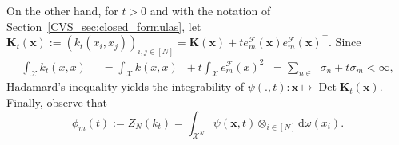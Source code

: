 \documentclass[twoside,11pt]{book}
\numberwithin{theorem}{chapter}
\numberwithin{definition}{chapter}
\numberwithin{proposition}{chapter}
\numberwithin{corollary}{chapter}
\numberwithin{example}{chapter}
\numberwithin{lemma}{chapter}
\numberwithin{assumption}{chapter}
\numberwithin{equation}{chapter}
\numberwithin{figure}{chapter}
\DeclareMathOperator{\Det}{Det}
\DeclareMathOperator{\Tran}{\intercal}
\DeclareMathOperator{\F}{\mathcal{F}}
\DeclareMathOperator{\X}{\mathcal{X}}
\DeclareMathOperator{\Mu}{\mathrm{d}\omega(x)}
\DeclareMathOperator{\Ns}{\mathbb{N}^{*}}
\begin{document}
On the other hand, for $t>0$ and with the notation of Section~\ref{CVS_sec:closed_formulas}, let $ \bm{K}_{t}(\bm{x}) := (k_{t}(x_{i},x_{j}))_{i,j \in [N]} = \bm{K}(\bm{x})+t e_{m}^{\mathcal{F}}(\bm{x})e_{m}^{\mathcal{F}}(\bm{x})^{\Tran}$.
Since
\begin{align}
\int_{\X} k_{t}(x,x) \Mu
& = \int_{\X} k(x,x) \Mu + t \int_{\X} e_{m}^{\F}(x)^{2} \Mu = \sum\limits_{n \in \Ns} \sigma_{n} + t \sigma_{m} < \infty,
\end{align}
Hadamard's inequality yields the integrability of
$
\psi(.,t): \bm{x} \mapsto \Det \bm{K}_{t}(\bm{x}).
$
Finally, observe that 
\begin{equation}
\phi_{m}(t) := Z_N(k_t) =  \int_{\X^{N}} \psi(\bm{x},t) \otimes_{i \in [N]} \mathrm{d}\omega(x_{i}).
\end{equation}
\end{document}
